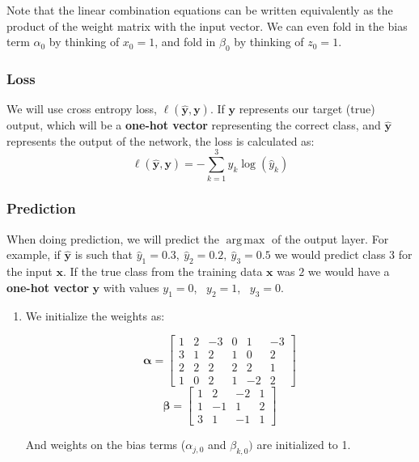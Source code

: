 \documentclass{article}
\DeclareMathOperator*{\argmax}{arg\,max}
\newcommand{\xv}{\mathbf{x}}
\newcommand{\yv}{\mathbf{y}}
\theoremstyle{definition}
\theoremstyle{remark}
\newenvironment{Q_nosol}
{%
\clearpage
\item
}
{%
\phantom{s} %
\bigskip
}
\begin{document}
\begin{enumerate}[font={\Large\bfseries},left=0pt]
\begin{Q_nosol}
Note that the linear combination equations can be written equivalently as the product of the weight matrix with the input vector. We can even fold in the bias term $\alpha_0$ by thinking of $x_0 = 1$, and fold in $\beta_0$ by thinking of $z_0 = 1$.

\subsubsection*{\textbf{Loss}}

We will use cross entropy loss, $\ell(\hat{\yv},\yv)$. If $\yv$ represents our target (true) output, which will be a \textbf{one-hot vector} representing the correct class, and $\hat{\yv}$ represents the output of the network, the loss is calculated as:
\begin{equation}
   \ell(\hat{\yv},\yv) = - \sum_{k=1}^3 y_k \log(\hat{y}_k)
\end{equation}

\subsubsection*{\textbf{Prediction}}
When doing prediction, we will predict the \textbf{$\argmax$} of the output layer. For example, if $\hat{\yv}$ is such that $\hat{y}_1=0.3,~ \hat{y}_2=0.2,~ \hat{y}_3=0.5$ we would predict class 3 for the input $\xv$. If the true class from the training data $\xv$ was $2$ we would have a \textbf{one-hot vector} $\yv$ with values $y_1=0$,~ $y_2=1$,~ $y_3=0$.
    
\begin{enumerate} 
\item 
     We initialize the weights as:
\begin{center}
$$\boldsymbol{\alpha}=
    \begin{bmatrix}
    1 & 2 & -3 & 0 & 1 & -3 \\
    3 & 1 & 2 & 1 & 0 & 2 \\
    2 & 2 & 2 & 2 & 2 & 1 \\
    1 & 0 & 2 & 1 & -2 & 2
    \end{bmatrix}$$
$$\boldsymbol{\beta}=
    \begin{bmatrix}
    1 & 2 & -2 & 1 \\
    1 & -1 & 1 & 2 \\
    3 & 1 & -1 & 1
    \end{bmatrix}
$$
\end{center}
    
And weights on the bias terms (${\alpha}_{j,0}$ and ${\beta}_{k,0})$ are initialized to 1.
    

\end{enumerate}
\end{Q_nosol}
\end{enumerate}
\end{document}
